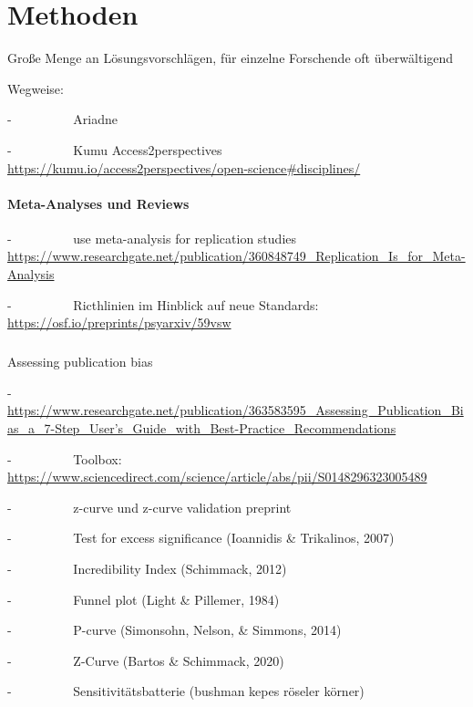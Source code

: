 \documentclass[
  letterpaper,
  DIV=11,
  numbers=noendperiod]{scrreprt}
\makeatletter
\let\oldparagraph\paragraph
\renewcommand{\paragraph}{
    \@ifstar
      \xxxParagraphStar
      \xxxParagraphNoStar
  }
\newcommand{\xxxParagraphStar}[1]{\oldparagraph*{#1}\mbox{}}
\newcommand{\xxxParagraphNoStar}[1]{\oldparagraph{#1}\mbox{}}
\makeatother
\begin{document}
\chapter{Methoden}\label{methoden}

Große Menge an Lösungsvorschlägen, für einzelne Forschende oft
überwältigend

Wegweise:

-~~~~~~~~~ Ariadne

-~~~~~~~~~ Kumu Access2perspectives
\url{https://kumu.io/access2perspectives/open-science\#disciplines/}

\subsubsection{Meta-Analyses und
Reviews}\label{meta-analyses-und-reviews}

-~~~~~~~~~ use meta-analysis for replication studies
\url{https://www.researchgate.net/publication/360848749_Replication_Is_for_Meta-Analysis}

-~~~~~~~~~ Ricthlinien im Hinblick auf neue Standards:
\url{https://osf.io/preprints/psyarxiv/59vsw}

\paragraph{Assessing publication bias}\label{assessing-publication-bias}

-~~~~~~~~~
\href{https://www.researchgate.net/publication/363583595_Assessing_Publication_Bias_a_7-Step_User's_Guide_with_Best-Practice_Recommendations}{https://www.researchgate.net/publication/363583595\_Assessing\_Publication\_Bias\_a\_7-Step\_User's\_Guide\_with\_Best-Practice\_Recommendations}

-~~~~~~~~~ Toolbox:
\url{https://www.sciencedirect.com/science/article/abs/pii/S0148296323005489}

-~~~~~~~~~ z-curve und z-curve validation preprint

-~~~~~~~~~ Test for excess significance (Ioannidis \& Trikalinos, 2007)

-~~~~~~~~~ Incredibility Index (Schimmack, 2012)

-~~~~~~~~~ Funnel plot (Light \& Pillemer, 1984)

-~~~~~~~~~ P-curve (Simonsohn, Nelson, \& Simmons, 2014)

-~~~~~~~~~ Z-Curve (Bartos \& Schimmack, 2020)

-~~~~~~~~~ Sensitivitätsbatterie (bushman kepes röseler körner)
\end{document}
